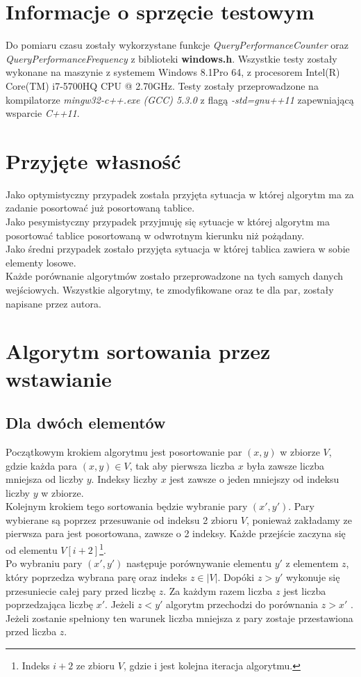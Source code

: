 \section{Informacje o sprzęcie testowym}
Do pomiaru czasu zostały wykorzystane funkcje \textit{QueryPerformanceCounter} oraz \textit{QueryPerformanceFrequency} z biblioteki \textbf{windows.h}. Wszystkie testy zostały wykonane na maszynie z systemem Windows 8.1Pro 64, z procesorem Intel(R) Core(TM) i7-5700HQ CPU @ 2.70GHz. Testy zostały przeprowadzone na kompilatorze \textit{mingw32-c++.exe (GCC) 5.3.0} z flagą \textit{-std=gnu++11} zapewniającą wsparcie \textit{C++11}.
\section{Przyjęte własność}
Jako optymistyczny przypadek została przyjęta sytuacja w której algorytm ma za zadanie posortować już posortowaną tablice.\\
Jako pesymistyczny przypadek przyjmuję się sytuacje w której algorytm ma posortować tablice posortowaną w odwrotnym kierunku niż pożądany.\\
Jako średni przypadek zostało przyjęta sytuacja w której tablica zawiera w sobie elementy losowe.\\
 Każde porównanie algorytmów zostało przeprowadzone na tych samych danych wejściowych. Wszystkie algorytmy, te zmodyfikowane oraz te dla par, zostały napisane przez autora.
\section{Algorytm sortowania przez wstawianie}

\subsection*{Dla dwóch elementów}

Początkowym krokiem algorytmu jest posortowanie  par $(x,y) $ w zbiorze $V  $, gdzie każda para $(x,y) \in V$,  tak aby pierwsza liczba $x$  była zawsze liczba mniejsza od liczby $y$. Indeksy liczby $x$ jest zawsze o jeden mniejszy od indeksu liczby $y$ w zbiorze.\\
 Kolejnym krokiem tego sortowania będzie wybranie  pary $(x',y')$. Pary wybierane są poprzez przesuwanie od indeksu 2 zbioru $V$, ponieważ zakładamy ze pierwsza para jest posortowana, zawsze o 2 indeksy. Każde przejście zaczyna się od elementu $V[i+2]$\footnote{Indeks $i+2$ ze zbioru $V$, gdzie i jest kolejna iteracja algorytmu.}.\\
Po wybraniu pary $(x',y')$ następuje porównywanie elementu $y'$ z elementem $z$, który poprzedza wybrana parę oraz indeks $z \in \lvert V \rvert $. Dopóki  $z > y'$  wykonuje się przesuniecie całej pary przed liczbę $z$. Za każdym razem liczba $z$ jest liczba poprzedzająca liczbę $x'$.
Jeżeli  $z < y'$ algorytm przechodzi do porównania $z > x'$ . Jeżeli zostanie spełniony ten warunek liczba mniejsza z pary zostaje przestawiona przed liczba $z$.
